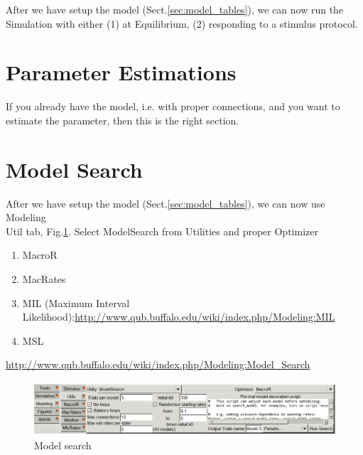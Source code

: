 After we have setup the model (Sect.\ref{sec:model_tables}), we can now run the
Simulation with either (1) at Equilibrium, (2) responding to a stimulus
protocol.

\section{Parameter Estimations}

If you already have the model, i.e. with proper connections, and you want to
estimate the parameter, then this is the right section.


\section{Model Search}

After we have setup the model (Sect.\ref{sec:model_tables}), we can now use
Modeling\\Util tab, Fig.\ref{fig:QuB_Express_04}. Select ModelSearch from
Utilities and proper Optimizer
\begin{enumerate}
  \item MacroR
  \item MacRates
  \item MIL (Maximum Interval
  Likelihood):\url{http://www.qub.buffalo.edu/wiki/index.php/Modeling:MIL}
  \item MSL
  
\end{enumerate}

\url{http://www.qub.buffalo.edu/wiki/index.php/Modeling:Model_Search}

\begin{figure}[hbt]
  \centerline{\includegraphics[height=2cm,
    angle=0]{./images/QuB_Express_04.eps}}
  \caption{Model search}
  \label{fig:QuB_Express_04}
\end{figure}

